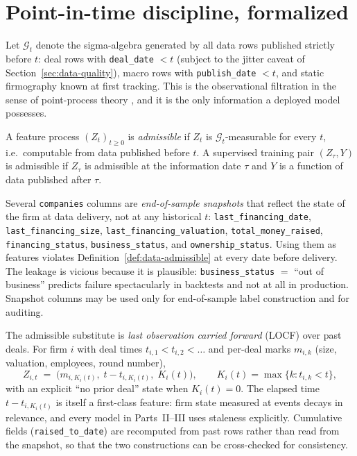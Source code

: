 \section{Point-in-time discipline, formalized}
\label{sec:data-pit}

Let $\mathcal{G}_t$ denote the sigma-algebra generated by all data rows published
strictly before $t$: deal rows with \texttt{deal\_date} $< t$ (subject to the jitter
caveat of Section~\ref{sec:data-quality}), macro rows with \texttt{publish\_date} $< t$,
and static firmography known at first tracking. This is the observational filtration in
the sense of point-process theory \cite{daley2003}, and it is the only information a
deployed model possesses.

\begin{definition}
\label{def:data-admissible}
A feature process $(Z_t)_{t \ge 0}$ is \emph{admissible} if $Z_t$ is
$\mathcal{G}_{t}$-measurable for every $t$, i.e.\ computable from data published before
$t$. A supervised training pair $(Z_{\tau}, Y)$ is admissible if $Z_\tau$ is admissible
at the information date $\tau$ and $Y$ is a function of data published after $\tau$.
\end{definition}

\begin{warning}
\label{warn:data-snapshot}
\sloppy
Several \texttt{companies} columns are \emph{end-of-sample snapshots} that reflect the
state of the firm at data delivery, not at any historical $t$:
\texttt{last\_financing\_date}, \texttt{last\_financing\_size},
\texttt{last\_financing\_valuation}, \texttt{total\_money\_raised},
\texttt{financing\_status}, \texttt{business\_status}, and
\texttt{ownership\_status}. Using them as features violates
Definition~\ref{def:data-admissible} at every date before delivery. The leakage is vicious
because it is plausible: \texttt{business\_status} $=$ ``out of business'' predicts
failure spectacularly in backtests and not at all in production. Snapshot columns may be
used only for end-of-sample label construction and for auditing.
\end{warning}

The admissible substitute is \emph{last observation carried forward} (LOCF) over past
deals. For firm $i$ with deal times $t_{i,1} < t_{i,2} < \dots$ and per-deal marks
$m_{i,k}$ (size, valuation, employees, round number),
\begin{equation}
\label{eq:data-locf}
Z_{i,t} \;=\; \Big( m_{i,K_i(t)},\; t - t_{i,K_i(t)},\; K_i(t) \Big),
\qquad K_i(t) = \max\{k : t_{i,k} < t\},
\end{equation}
with an explicit ``no prior deal'' state when $K_i(t) = 0$. The elapsed time
$t - t_{i,K_i(t)}$ is itself a first-class feature: firm state measured at events decays
in relevance, and every model in Parts~II--III uses staleness explicitly. Cumulative
fields (\texttt{raised\_to\_date}) are recomputed from past rows rather than read from
the snapshot, so that the two constructions can be cross-checked for consistency.


